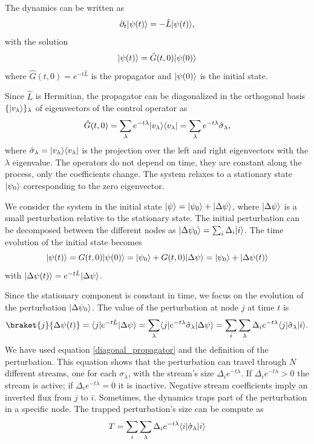 The dynamics can be written as
\begin{equation} \label{time_evolution}
    \partial_t \lvert\psi(t)\rangle = - \hat L \lvert\psi(t)\rangle,
\end{equation}
with the solution
\begin{equation}
    \lvert\psi(t)\rangle = \hat G(t,0) \lvert\psi(0)\rangle
\end{equation}
where $\hat G(t,0) = e^{-t\hat L}$ is the propagator and $\lvert\psi(0)\rangle$ is the initial state. 

Since $\hat L$ is Hermitian, the propagator can be diagonalized in the orthogonal basis $\{\lvert v_\lambda\rangle\}_\lambda$ of eigenvectors of the control operator as
\begin{equation}\label{diagonal_propagator}
    \hat G(t,0) = \sum_\lambda e^{-t\lambda} \lvert v_\lambda\rangle\langle v_\lambda\rvert = \sum_\lambda e^{-t\lambda} \hat \sigma_\lambda,
\end{equation}
where $\hat \sigma_\lambda = \lvert v_\lambda\rangle\langle v_\lambda\rvert$ is the projection over the left and right eigenvectors with the $\lambda$ eigenvalue. The operators do not depend on time, they are constant along the process, only the coefficients change.
The system relaxes to a stationary state $\lvert\psi_0\rangle$ corresponding to the zero eigenvector.

We consider the system in the initial state $\lvert\psi\rangle = \lvert\psi_0\rangle + \lvert\Delta\psi\rangle$, where $\lvert\Delta\psi\rangle$ is a small perturbation relative to the stationary state. The initial perturbation can be decomposed between the different nodes as $\lvert\Delta\psi_0\rangle = \sum_i \Delta_i \lvert i\rangle$.
The time evolution of the initial state becomes
\begin{equation}
    \lvert\psi(t)\rangle = G(t,0) \lvert\psi(0)\rangle = \lvert\psi_0\rangle + G(t,0)\lvert\Delta\psi\rangle = \lvert\psi_0\rangle + \lvert\Delta\psi(t)\rangle
\end{equation}
with $\lvert\Delta\psi(t)\rangle = e^{-t\hat L} \lvert\Delta \psi\rangle$.

Since the stationary component is constant in time, we focus on the evolution of the perturbation $\lvert\Delta\psi_0\rangle$. 
The value of the perturbation at node $j$ at time $t$ is
\begin{equation}
    \braket{j}{\Delta\psi(t)} = \bra{j} e^{-t\hat L} \ket{\Delta\psi} =\sum_\lambda \bra{j} e^{-t\lambda} \hat \sigma_\lambda\ket{\Delta\psi} = \sum_i  \sum_\lambda \Delta_i e^{-t\lambda} \bra{j}  \hat \sigma_\lambda \ket{i}.
\end{equation}
We have used equation \eqref{diagonal_propagator} and the definition of the perturbation.
This equation shows that the perturbation can travel through $N$ different streams, one for each $\sigma_\lambda$, with the stream's size $\Delta_i e^{-t\lambda}$. If $\Delta_i e^{-t\lambda} > 0$ the stream is active; if $\Delta_i e^{-t\lambda} = 0$ it is inactive. Negative stream coefficients imply an inverted flux from $j$ to $i$.
Sometimes, the dynamics traps part of the perturbation in a specific node. The trapped perturbation's size can be compute as
\begin{equation}\label{T_equation}
    T = \sum_i  \sum_\lambda \Delta_i e^{-t\lambda} \langle i\rvert  \hat \sigma_\lambda \lvert i\rangle 
\end{equation} 

